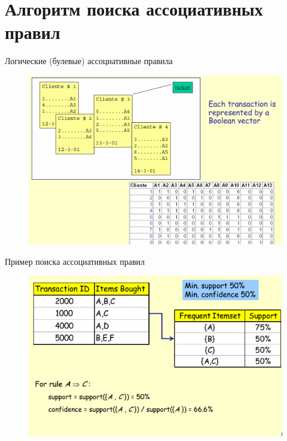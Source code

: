 \documentclass{beamer}
\begin{document}
\section{Алгоритм поиска ассоциативных правил}
\begin{frame}{Логические (булевые) ассоциативные правила}
\begin{figure}[h]
\centering
\includegraphics[scale=0.75]{images/lec08-pic07.png}
\end{figure}
\end{frame}

\begin{frame}{Пример поиска ассоциативных правил}
\begin{figure}[h]
\centering
\includegraphics[scale=0.75]{images/lec08-pic08.png}
\end{figure}
\end{frame}
\end{document}
